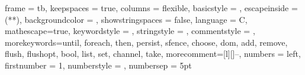 \newcommand{\linefill}{\cleaders\hbox{$\smash{\mkern-2mu\mathord-\mkern-2mu}$}\hfill\vphantom{\lower1pt\hbox{$\rightarrow$}}}  
\newcommand{\Linefill}{\cleaders\hbox{$\smash{\mkern-2mu\mathord=\mkern-2mu}$}\hfill\vphantom{\hbox{$\Rightarrow$}}}  
\newcommand{\transi}[2]{\mathrel{\lower1pt\hbox{$\mathrel-_{\vphantom{#2}}\mkern-8mu\stackrel{#1}{\linefill_{\vphantom{#2}}}\mkern-11mu\rightarrow_{#2}$}}}
\newcommand{\trans}[1]{\transi{#1}{{}}}
\newcommand{\transo}{\mathord{\trans{~}}}
\newcommand{\ntransi}[2]{\mathrel{\lower1pt\hbox{$\mathrel-_{\vphantom{#2}}\mkern-8mu\stackrel{#1}{\linefill_{\vphantom{#2}}}\mkern-8mu\nrightarrow_{#2}$}}}
\newcommand{\ntrans}[1]{\ntransi{#1}{{}}}


\newcommand{\threads}{T}

\newcommand{\astate}{\sigma}
\newcommand{\allstates}{\Sigma}
\newcommand{\compstep}{\mathtt{cmp}}
\newcommand{\envstep}{\mathtt{env}}
\newcommand{\memstep}{\mathtt{mem}}

\newcommand{\last}{\mathsf{last}}

\newcommand{\wf}{\mathsf{wf}}
\newcommand{\strongpost}{\mathit{sp}}
\newcommand{\cmdaux}{\cmd^{\mathit{aux}}} 
\newcommand{\bexp}{\mathit{b}}
\newcommand{\rem}[2]{\mathit{rem}(#1,#2)} 
\newcommand{\prop}{{P}}
\newcommand{\relation}{{R}}
\newcommand{\program}{{prog}}
\newcommand{\id}{{id}}


\newcommand{\assert}[1]{{\color{blue}{\ensuremath{\left\{
    \begin{array}[c]{@{}l@{}}
      #1
    \end{array}
  \right\}}}}}


\newcommand*{\mycommentstyle}[1]{%
  \begingroup
    \color{teal}
    \rmfamily%
    \itshape%
    \lstset{columns=fullflexible}%
    #1%
  \endgroup
}

\newcommand{\lineno}[1]{line~\ref{#1}}
\newcommand{\linenos}[2]{lines~\ref{#1}--\ref{#2}}

\lstset
{
    frame            = tb, %
    keepspaces       = true,
    columns          = flexible,
    basicstyle       = {\linespread{0.9}\ttfamily\footnotesize},
    escapeinside     = {(*}{*)}, %
    backgroundcolor  = \color{codebackground},
    showstringspaces = false,
    language         = C,
    mathescape=true,
    keywordstyle     = {\bfseries\color{blue}},
    stringstyle      = {\bfseries\color{red}},
    commentstyle     = {\lst@column@fullflexible\color{teal}\footnotesize},
    morekeywords={until, foreach, then, persist, sfence, choose, dom, add, remove, flush, flushopt, bool, list, set, channel, take},
    morecomment=[l][\lst@column@fullflexible\color{teal}\footnotesize]{--},
    numbers          = left, %
    firstnumber      = 1,
    numberstyle      = \scriptsize\color{black},
    numbersep        = 5pt
}



